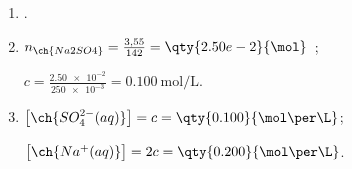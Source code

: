 \begin{enumerate}
    \item {}.
    \item $n_{\ch{Na2SO4}}=\frac{3,55}{142}=\qty{2.50e-2}{\mol}$~;
    
          $c=\frac{\num{2.50e-2}}{\num{250e-3}}=\qty{0.100}{\mol\per\L}$.
    \item $\bigl[\ch{SO_4^{2-}(aq)}\bigr]=c=\qty{0.100}{\mol\per\L}$;

          $\bigl[\ch{Na^{+}(aq)}\bigr]=2c=\qty{0.200}{\mol\per\L}$.
\end{enumerate}
